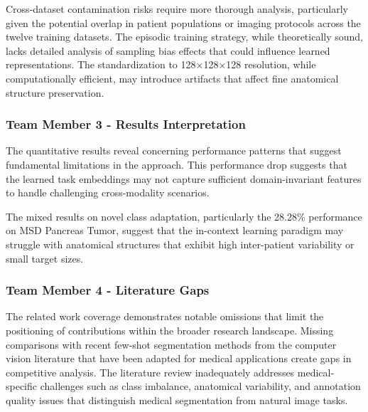 Cross-dataset contamination risks require more thorough analysis, particularly given the potential overlap in patient populations or imaging protocols across the twelve training datasets. The episodic training strategy, while theoretically sound, lacks detailed analysis of sampling bias effects that could influence learned representations. The standardization to 128×128×128 resolution, while computationally efficient, may introduce artifacts that affect fine anatomical structure preservation.

\subsubsection{Team Member 3 - Results Interpretation}
The quantitative results reveal concerning performance patterns that suggest fundamental limitations in the approach.  This performance drop suggests that the learned task embeddings may not capture sufficient domain-invariant features to handle challenging cross-modality scenarios.

 The mixed results on novel class adaptation, particularly the 28.28\% performance on MSD Pancreas Tumor, suggest that the in-context learning paradigm may struggle with anatomical structures that exhibit high inter-patient variability or small target sizes.

\subsubsection{Team Member 4 - Literature Gaps}
The related work coverage demonstrates notable omissions that limit the positioning of contributions within the broader research landscape. Missing comparisons with recent few-shot segmentation methods from the computer vision literature that have been adapted for medical applications create gaps in competitive analysis. The literature review inadequately addresses medical-specific challenges such as class imbalance, anatomical variability, and annotation quality issues that distinguish medical segmentation from natural image tasks.

